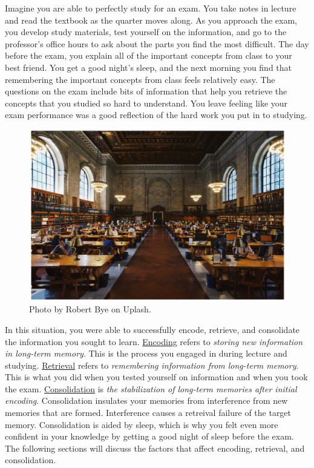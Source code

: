 \documentclass[
]{krantz}
\begin{document}
Imagine you are able to perfectly study for an exam. You take notes in lecture and read the textbook as the quarter moves along. As you approach the exam, you develop study materials, test yourself on the information, and go to the professor's office hours to ask about the parts you find the most difficult. The day before the exam, you explain all of the important concepts from class to your best friend. You get a good night's sleep, and the next morning you find that remembering the important concepts from class feels relatively easy. The questions on the exam include bits of information that help you retrieve the concepts that you studied so hard to understand. You leave feeling like your exam performance was a good reflection of the hard work you put in to studying.

\begin{figure}

{\centering \includegraphics[width=0.6\linewidth]{images/ch5/fig3} 

}

\caption{Photo by Robert Bye on Uplash.}\label{fig:library}
\end{figure}

In this situation, you were able to successfully encode, retrieve, and consolidate the information you sought to learn. \hyperref[encoding]{Encoding} refers to \emph{storing new information in long-term memory}. This is the process you engaged in during lecture and studying. \hyperref[retrieval]{Retrieval} refers to \emph{remembering information from long-term memory}. This is what you did when you tested yourself on information and when you took the exam. \hyperref[consolidation]{Consolidation} is \emph{the stabilization of long-term memories after initial encoding}. Consolidation insulates your memories from interference from new memories that are formed. Interference causes a retreival failure of the target memory. Consolidation is aided by sleep, which is why you felt even more confident in your knowledge by getting a good night of sleep before the exam. The following sections will discuss the factors that affect encoding, retrieval, and consolidation.
\end{document}
